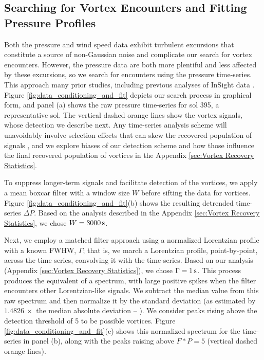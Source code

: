 \documentclass[linenumbers,trackchanges]{aastex63}
\begin{document}
\subsection{Searching for Vortex Encounters and Fitting Pressure Profiles}
\label{sec:Searching for Vortex Encounters and Fitting Pressure Profiles}
Both the pressure and wind speed data exhibit turbulent excursions that constitute a source of non-Gaussian noise and complicate our search for vortex encounters. However, the pressure data are both more plentiful and less affected by these excursions, so we search for encounters using the pressure time-series. This approach  many prior studies, including previous analyses of InSight data \citep{2021JGRE..12606511S, 2021Icar..35514119L}. Figure \ref{fig:data_conditioning_and_fit} depicts our search process in graphical form, and panel (a) shows the raw pressure time-series for sol 395, a representative sol. The vertical dashed orange lines show the vortex signals, whose detection we describe next. Any time-series analysis scheme will unavoidably involve selection effects that can skew the recovered population of signals \citep{2018Icar..299..166J}, and we explore biases of our detection scheme and how those influence the final recovered population of vortices in the Appendix \ref{sec:Vortex Recovery Statistics}. 

To suppress longer-term signals and facilitate detection of the vortices, we apply a mean boxcar filter with a window size $W$ before sifting the data for vortices. Figure \ref{fig:data_conditioning_and_fit}(b) shows the resulting detrended time-series $\Delta P$. Based on the analysis described in the Appendix \ref{sec:Vortex Recovery Statistics}, we chose $W = 3000\,{\rm s}$. 

Next, we employ a matched filter approach \citep[][ch.~13]{Press2007} using a normalized Lorentzian profile with a known FWHW, $\Gamma$; that is, we march a Lorentzian profile, point-by-point, across the time series, convolving it with the time-series. Based on our analysis (Appendix \ref{sec:Vortex Recovery Statistics}), we chose $\Gamma = 1\,{\rm s}$. This process produces the equivalent of a spectrum, with large positive spikes when the filter encounters other Lorentzian-like signals. We subtract the median value from this raw spectrum and then normalize it by the standard deviation (as estimated by $1.4826\ \times$ the median absolute deviation -- \citealp{doi:10.1080/01621459.1993.10476408}). We consider peaks rising above the detection threshold of 5 to be possible vortices. Figure \ref{fig:data_conditioning_and_fit}(c) shows this normalized spectrum for the time-series in panel (b), along with the peaks raising above $F \ast P = 5$ (vertical dashed orange lines). 
\end{document}
